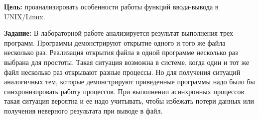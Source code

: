 \Introduction

\textbf{Цель:} проанализировать особенности работы функций ввода-вывода в UNIX/Linux.

\textbf{Задание:}
В лабораторной работе анализируется результат выполнения трех программ. Программы
демонстрируют открытие одного и того же файла несколько раз. Реализация открытия файла в
одной программе несколько раз выбрана для простоты. Такая ситуация возможна в системе,
когда один и тот же файл несколько раз открывают разные процессы. Но для получения
ситуаций аналогичных тем, которые демонстрируют приведенные программы надо было бы
синхронизировать работу процессов. При выполнении асинхронных процессов такая ситуация
вероятна и ее надо учитывать, чтобы избежать потери данных или получения неверного
результата при выводе в файл.
